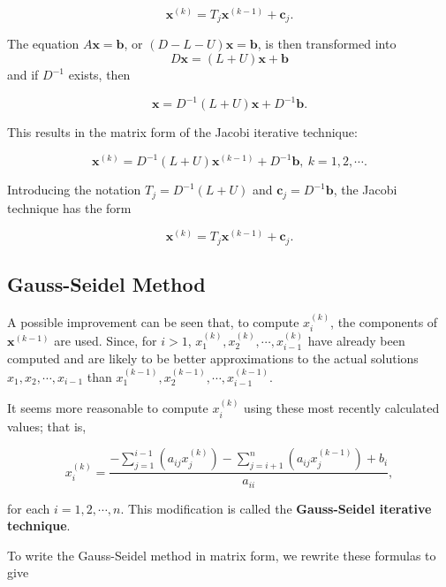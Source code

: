 \documentclass[preprint,12pt]{elsarticle}
\begin{document}
\begin{equation*}
    \mathbf{x}^{(k)} = T_j\mathbf{x}^{(k-1)} + \mathbf{c}_j.
\end{equation*}

The equation $A\mathbf{x} = \mathbf{b}$, or $(D - L - U)\mathbf{x} = \mathbf{b}$, is then transformed into \[D\mathbf{x} = (L + U)\mathbf{x} + \mathbf{b}\] and if $D^{-1}$ exists, then

$$
\mathbf{x} = D^{-1}(L + U)\mathbf{x} + D^{-1}\mathbf{b}.
$$

This results in the matrix form of the Jacobi iterative technique:

\begin{equation*}
\mathbf{x}^{(k)} = D^{-1}(L + U)\mathbf{x}^{(k-1)} +
D^{-1}\mathbf{b},\ k = 1, 2,\cdots.
\end{equation*}

Introducing the notation $T_j = D^{-1}(L + U)$ and $\mathbf{c}_j = D^{-1}\mathbf{b}$, the Jacobi technique has the form

\begin{equation*}
    \mathbf{x}^{(k)} = T_j\mathbf{x}^{(k-1)} + \mathbf{c}_j.
\end{equation*}

\subsection{Gauss-Seidel Method}
\label{SS:2.2}

A possible improvement can be seen that, to compute $x_i^{(k)}$, the components of $\mathbf{x}^{(k-1)}$ are used. Since, for $i> 1$, $x_1^{(k)},x_2^{(k)},\cdots,x_{i-1}^{(k)}$ have already been computed and are likely to be better approximations to the actual solutions $x_1,x_2,\cdots,x_{i-1}$ than $x_1^{(k-1)},x_2^{(k-1)},\cdots,x_{i-1}^{(k-1)}$.

It seems more reasonable to compute $x_i^{(k)}$ using these most recently calculated values; that is,

\begin{equation*}
    x_i^{(k)}=\frac{-\sum\limits_{j=1}^{i-1}(a_{ij}x_j^{(k)})
    -\sum\limits_{j=i+1}^n(a_{ij}x_j^{(k-1)})+b_i}{a_{ii}},
\end{equation*}

for each $i = 1, 2,\cdots, n$. This modification is called the \textbf{Gauss-Seidel iterative technique}.

To write the Gauss-Seidel method in matrix form, we rewrite these formulas to give
\end{document}
